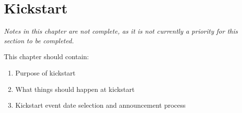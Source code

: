 \section{Kickstart}

\textit{Notes in this chapter are not complete, as it is not currently a priority for this section to be completed.}

This chapter should contain:
\begin{enumerate}
\item Purpose of kickstart
\item What things should happen at kickstart
\item Kickstart event date selection and announcement process
\end{enumerate}
